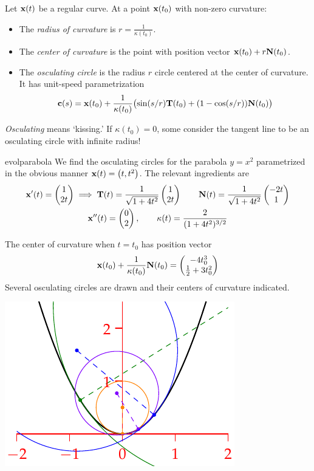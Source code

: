 \begin{defn}{}{}
	Let ${\mathbf{x}}(t)$ be a regular curve. At a point ${\mathbf{x}}(t_0)$ with non-zero curvature:
	\begin{itemize}\itemsep0pt
	  \item The \emph{radius of curvature} is $r=\frac 1{\kappa(t_0)}$.
	  \item The \emph{center of curvature} is the point with position vector ${\mathbf{x}}(t_0)+r{\mathbf{N}}(t_0)$.
		\item The \emph{osculating circle} is the radius $r$ circle centered at the center of curvature. It has unit-speed parametrization
		\[
			{\mathbf{c}}(s)={\mathbf{x}}(t_0) +\frac 1{\kappa(t_0)}\bigl(\sin(s/r){\mathbf{T}}(t_0) +(1-\cos(s/r)){\mathbf{N}}(t_0)\bigr)
		\]
	\end{itemize}
\end{defn}

\emph{Osculating} means `kissing.' If $\kappa(t_0)=0$, some consider the tangent line to be an osculating circle with infinite radius!


\goodbreak

\begin{example}{}{evolparabola}
	We find the osculating circles for the parabola $y=x^2$ parametrized in the obvious manner ${\mathbf{x}}(t)=\bigl(t,t^2\bigr)$. The relevant ingredients are
	\begin{gather*}
		{\mathbf{x}}'(t)=\begin{pmatrix}1\\2t\end{pmatrix}\implies {\mathbf{T}}(t)=\frac 1{\sqrt{1+4t^2}}\begin{pmatrix}1\\2t\end{pmatrix} \qquad {\mathbf{N}}(t)=\frac{1}{\sqrt{1+4t^2}}\begin{pmatrix}-2t\\1\end{pmatrix}\\
		{\mathbf{x}}''(t)=\begin{pmatrix}0\\2\end{pmatrix},\qquad \kappa(t)=\frac 2{(1+4t^2)^{3/2}}
	\end{gather*}
	\begin{minipage}[t]{0.59\linewidth}\vspace{0pt}
		The center of curvature when $t=t_0$ has position vector
		\[
			\vx(t_0)+\frac{1}{\kappa(t_0)}\vN(t_0)=%
			\twovec{-4t_0^3}{\frac 12+3t_0^2}
		\]
		Several osculating circles are drawn and their centers of curvature indicated.
	\end{minipage}
	\hfill
	\begin{minipage}[t]{0.40\linewidth}\vspace{-35pt}
		\flushright\includegraphics[scale=1]{radii-osculating3}
	\end{minipage}
\end{example}


